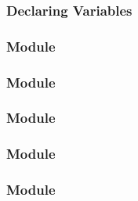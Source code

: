 \documentclass[t, notes, xcolor=table]{beamer}
\begin{document}
\begin{frame}
\frametitle{Declaring Variables}

\end{frame}

\begin{frame}
\frametitle{Module}

\end{frame}

\begin{frame}
\frametitle{Module}

\end{frame}

\begin{frame}
\frametitle{Module}

\end{frame}

\begin{frame}
\frametitle{Module}

\end{frame}

\begin{frame}
\frametitle{Module}

\end{frame}
\end{document}
